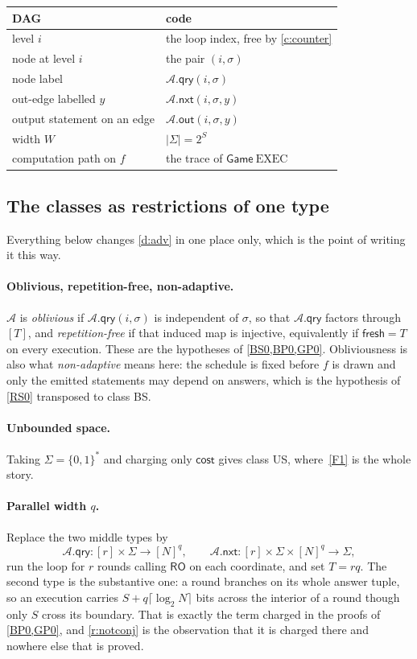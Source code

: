 \documentclass[11pt]{article}
\theoremstyle{plain}
\theoremstyle{definition}
\newcommand{\NN}{[N]}
\newcommand{\advers}{\mathcal{A}}
\newcommand{\cls}[1]{\textsf{#1}}   %
\newcommand{\qry}{\mathsf{qry}}
\newcommand{\nxt}{\mathsf{nxt}}
\newcommand{\outp}{\mathsf{out}}
\newcommand{\Exec}{\mathrm{EXEC}}
\newcommand{\RO}{\mathsf{RO}}
\begin{document}
\begin{center}
\small
\begin{tabular}{@{}ll@{}}
\toprule
DAG & code \\
\midrule
level $i$ & the loop index, free by \cref{c:counter} \\
node at level $i$ & the pair $(i,\sigma)$ \\
node label & $\advers.\qry(i,\sigma)$ \\
out-edge labelled $y$ & $\advers.\nxt(i,\sigma,y)$ \\
output statement on an edge & $\advers.\outp(i,\sigma,y)$ \\
width $W$ & $|\Sigma| = 2^{S}$ \\
computation path on $f$ & the trace of $\mathsf{Game}~\Exec$ \\
\bottomrule
\end{tabular}
\end{center}

\subsection{The classes as restrictions of one type}\label{app:classes}

Everything below changes \cref{d:adv} in one place only, which is the point
of writing it this way.

\paragraph{Oblivious, repetition-free, non-adaptive.}
$\advers$ is \emph{oblivious} if $\advers.\qry(i,\sigma)$ is independent of
$\sigma$, so that $\advers.\qry$ factors through $[T]$, and
\emph{repetition-free} if that induced map is injective, equivalently if
$\mathsf{fresh} = T$ on every execution.  These are the hypotheses of
\cref{BS0,BP0,GP0}.  Obliviousness is also what \emph{non-adaptive} means
here: the schedule is fixed before $f$ is drawn and only the emitted
statements may depend on answers, which is the hypothesis of \cref{RS0}
transposed to class \cls{BS}.

\paragraph{Unbounded space.}
Taking $\Sigma = \{0,1\}^{*}$ and charging only $\mathsf{cost}$ gives class
\cls{US}, where~\ref{F1} is the whole story.

\paragraph{Parallel width $q$.}
Replace the two middle types by
\[
  \advers.\qry \colon [r] \times \Sigma \to \NN^{q},
  \qquad
  \advers.\nxt \colon [r] \times \Sigma \times \NN^{q} \to \Sigma ,
\]
run the loop for $r$ rounds calling $\RO$ on each coordinate, and set
$T = rq$.  The second type is the substantive one: a round branches on its
whole answer tuple, so an execution carries
$S + q\lceil\log_{2}N\rceil$ bits across the interior of a round though only
$S$ cross its boundary.  That is exactly the term charged in the proofs of
\cref{BP0,GP0}, and \cref{r:notconj} is the observation that it is charged
there and nowhere else that is proved.
\end{document}
